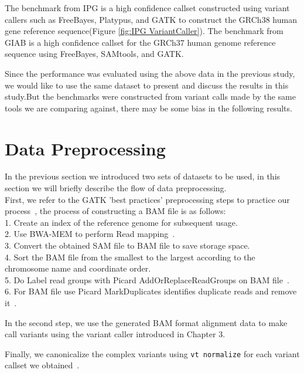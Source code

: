 \documentclass[PhD]{PHlab-thesis}
\begin{document}
The benchmark from IPG is a high confidence callset constructed using variant callers such as FreeBayes, Platypus, and GATK to construct the GRCh38 human gene reference sequence(Figure \ref{fig:IPG VariantCaller}).
The benchmark from GIAB is a high confidence callset for the GRCh37 human genome reference sequence using FreeBayes, SAMtools, and GATK.

Since the performance was evaluated using the above data in the previous study, we would like to use the same dataset to present and discuss the results in this study.But the benchmarks were constructed from variant calls made by the same tools we are comparing against, there may be some bias in the following results.
\section{Data Preprocessing}
In the previous section we introduced two sets of datasets to be used, in this section we will briefly describe the flow of data preprocessing.\\
First, we refer to the GATK 'best practices' preprocessing steps to practice our process~\cite{Geraldine2013GATKBestP}, the process of constructing a BAM file is as follows:\\
1. Create an index of the reference genome for subsequent usage.\\
2. Use BWA-MEM to perform Read mapping~\cite{Li2013BWA}.\\3. Convert the obtained SAM file to BAM file to save storage space.\\
4. Sort the BAM file from the smallest to the largest according to the chromosome name and coordinate order.\\
5. Do Label read groups with Picard AddOrReplaceReadGroups on BAM file~\cite{AddOrReplaceReadGroups}.\\
6. For BAM file use Picard MarkDuplicates identifies duplicate reads and remove it~\cite{MarkDuplicates}.

In the second step, we use the generated BAM format alignment data to make call variants using the variant caller introduced in Chapter 3.

Finally, we canonicalize the complex variants using \texttt{vt normalize} for each variant callset we obtained~\cite{Tan2015Vt}.
\end{document}
